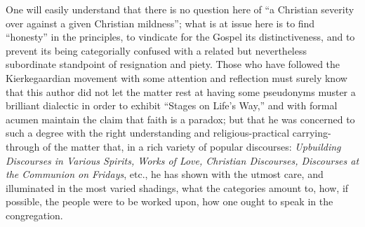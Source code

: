 \documentclass[12pt,a4paper]{article}
\newcommand{\opage}[1]{\marginnote{\footnotesize\textit{[#1]}}}
\begin{document}
One will easily understand that there is no question here of ``a
Christian severity over against a given Christian mildness'';
what is at issue here is to find ``honesty'' in the principles,
to vindicate for the Gospel its distinctiveness, and to prevent
its being categorially confused with a related
but nevertheless subordinate standpoint of resignation and piety.
Those who have followed the Kierkegaardian movement with some attention and reflection
must surely know that this author did not let the matter rest at
having some pseudonyms muster a brilliant dialectic
in order to exhibit ``Stages on Life's Way,'' and with formal
acumen maintain the claim that faith is a paradox;
but that he was concerned to such a degree with the right
\opage{11}understanding and religious-practical carrying-through of the matter
that, in a rich variety of popular discourses:
\emph{Upbuilding Discourses in Various Spirits, Works of Love,
Christian Discourses, Discourses at the Communion on Fridays}, etc.,
he has shown with the utmost care, and illuminated in the most varied
shadings, what the categories amount to, how, if possible, the people
were to be worked upon, how one ought to speak in the congregation.
\end{document}
